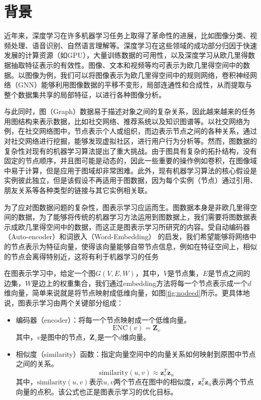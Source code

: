 \usepackage{CJK}

\section{背景}
近年来，深度学习在许多机器学习任务上取得了革命性的进展，比如图像分类、视频处理、语音识别、自然语言理解等。深度学习在这些领域的成功部分归因于快速发展的计算资源（如GPU），大量训练数据的可用性，以及深度学习从欧几里得数据抽取特征表示的有效性。图像、文本和视频等均可表示为欧几里得空间中的数据。以图像为例，我们可以将图像表示为欧几里得空间中的规则网络，卷积神经网络（GNN）\cite{NIPS2012_4824}能够利用图像数据的平移不变形，局部连通性和合成性，从而提取与整个数据集共享的局部特征，以进行各种图像分析。

与此同时，图（Graph）数据易于描述对象之间的复杂关系，因此越来越来的任务用图结构来表示数据，比如社交网络、推荐系统以及知识图谱等。以社交网络为例，在社交网络图中，节点表示个人或组织，而边表示节点之间的各种关系，通过对社交网络进行挖掘，能够发现虚拟社区，进行用户行为分析等。然而，图数据的复杂性对现有的机器学习算法提出了重大挑战。由于图具有复杂的拓扑结构，没有固定的节点顺序，并且图可能是动态的，因此一些重要的操作例如卷积，在图像域中易于计算，但是应用于图域却非常困难。此外，现有机器学习算法的核心假设是实例彼此独立，但是该假设不再适用于图数据，因为每个实例（节点）通过引用、朋友关系等各种类型的链接与其它实例相关联。

为了应对图数据问题的复杂性，图表示学习应运而生。图数据本身是非欧几里得空间的数据，为了能够将传统的机器学习方法运用到图数据上，我们需要将图数据表示成欧几里得空间中的数据，而这正是图表示学习所研究的内容。受自动编码器（Auto-encoder）\cite{hinton2006reducing}和词嵌入（Word-Embedding）\cite{mikolov2013distributed} 的启发，我们希望能够将网络中的节点表示为特征向量，使得该向量能够自带节点信息，例如在特征空间上，相似的节点会离得特别近，这将有利于机器学习的任务

在图表示学习中，给定一个图$G(V, E, W)$，其中，$V$是节点集，$E$是节点之间的边集，$W$是边上的权重集合，我们通过embedding方法将每一个节点表示成一个$d$维向量，简单来说就是将节点映射成低维向量，如图\ref{fig:nodeed}所示。更具体地说，图表示学习由两个关键部分组成：
\begin{itemize}
  \item 编码器（encoder）：将每一个节点映射成一个低维向量。
	\[\text{ENC}(v) = \textbf{Z}_v\]
	其中，$v$是图中的节点，$\textbf{Z}_v$是一个$d$维向量。
	\item 相似度（similarity）函数：指定向量空间中的向量关系如何映射到原图中节点之间的关系。
	  \[\text{similarity}(u, v) \approx \textbf{z}_v^T\textbf{z}_u\]
	  其中，$\text{similarity}(u, v)$表示$u, v$两个节点在图中的相似度，$\textbf{z}_v^T \textbf{z}_u$表示两个节点向量的点积。该公式也正是图表示学习的优化目标。
\end{itemize}

